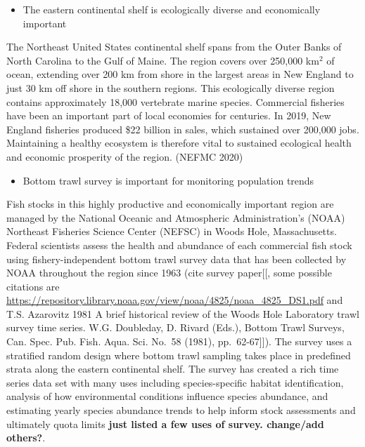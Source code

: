 \documentclass[
  12pt,
]{article}
\providecommand{\tightlist}{%
  \setlength{\itemsep}{0pt}\setlength{\parskip}{0pt}}
\begin{document}
\begin{itemize}
\tightlist
\item
  The eastern continental shelf is ecologically diverse and economically important
\end{itemize}

The Northeast United States continental shelf spans from the Outer Banks of North Carolina to the Gulf of Maine. The region covers over 250,000 km\(^2\) of ocean, extending over 200 km from shore in the largest areas in New England to just 30 km off shore in the southern regions. This ecologically diverse region contains approximately 18,000 vertebrate marine species. Commercial fisheries have been an important part of local economies for centuries. In 2019, New England fisheries produced \$22 billion in sales, which sustained over 200,000 jobs. Maintaining a healthy ecosystem is therefore vital to sustained ecological health and economic prosperity of the region. (NEFMC 2020)

\begin{itemize}
\tightlist
\item
  Bottom trawl survey is important for monitoring population trends
\end{itemize}

Fish stocks in this highly productive and economically important region are managed by the National Oceanic and Atmospheric Administration's (NOAA) Northeast Fisheries Science Center (NEFSC) in Woods Hole, Massachusetts. Federal scientists assess the health and abundance of each commercial fish stock using fishery-independent bottom trawl survey data that has been collected by NOAA throughout the region since 1963 (cite survey paper{[}{[}, some possible citations are \url{https://repository.library.noaa.gov/view/noaa/4825/noaa_4825_DS1.pdf} and T.S. Azarovitz 1981 A brief historical review of the Woods Hole Laboratory trawl survey time series. W.G. Doubleday, D. Rivard (Eds.), Bottom Trawl Surveys, Can. Spec. Pub. Fish. Aqua. Sci. No.~58 (1981), pp.~62-67{]}{]}). The survey uses a stratified random design where bottom trawl sampling takes place in predefined strata along the eastern continental shelf. The survey has created a rich time series data set with many uses including species-specific habitat identification, analysis of how environmental conditions influence species abundance, and estimating yearly species abundance trends to help inform stock assessments and ultimately quota limits \textbf{just listed a few uses of survey. change/add others?}.
\end{document}
